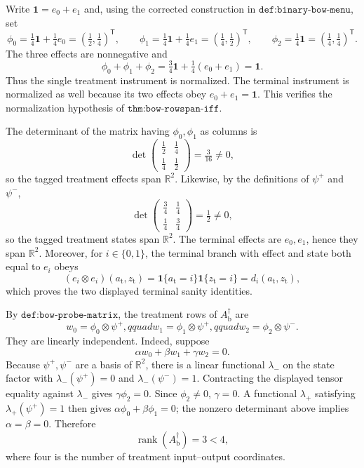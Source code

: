 Write \(\mathbf 1=e_0+e_1\) and, using the corrected construction in \(\texttt{def:binary-bow-menu}\), set
\[
 \phi_0=\tfrac14\mathbf 1+\tfrac14e_0=(\tfrac12,\tfrac14)^{\mathsf T},\qquad
 \phi_1=\tfrac14\mathbf 1+\tfrac14e_1=(\tfrac14,\tfrac12)^{\mathsf T},\qquad
 \phi_2=\tfrac14\mathbf 1=(\tfrac14,\tfrac14)^{\mathsf T}.
\]
The three effects are nonnegative and
\[
 \phi_0+\phi_1+\phi_2
 =\tfrac34\mathbf 1+\tfrac14(e_0+e_1)
 =\mathbf 1.
\]
Thus the single treatment instrument is normalized.  The terminal instrument is normalized as well because its two effects obey \(e_0+e_1=\mathbf 1\).  This verifies the normalization hypothesis of \(\texttt{thm:bow-rowspan-iff}\).

The determinant of the matrix having \(\phi_0,\phi_1\) as columns is
\[
 \det\!\begin{pmatrix}\tfrac12&\tfrac14\\[2pt]\tfrac14&\tfrac12\end{pmatrix}
 =\tfrac{3}{16}\ne0,
\]
so the tagged treatment effects span \(\mathbb R^2\).  Likewise, by the definitions of \(\psi^+\) and \(\psi^-\),
\[
 \det\!\begin{pmatrix}\tfrac34&\tfrac14\\[2pt]\tfrac14&\tfrac34\end{pmatrix}
 =\tfrac12\ne0,
\]
so the tagged treatment states span \(\mathbb R^2\).  The terminal effects are \(e_0,e_1\), hence they span \(\mathbb R^2\).  Moreover, for \(i\in\{0,1\}\), the terminal branch with effect and state both equal to \(e_i\) obeys
\[
 (e_i\otimes e_i)(a_{\mathrm t},z_{\mathrm t})
 =\mathbf 1\{a_{\mathrm t}=i\}\mathbf 1\{z_{\mathrm t}=i\}
 =d_i(a_{\mathrm t},z_{\mathrm t}),
\]
which proves the two displayed terminal sanity identities.

By \(\texttt{def:bow-probe-matrix}\), the treatment rows of \(A_{\mathrm b}^{\dagger}\) are
\[
 w_0=\phi_0\otimes\psi^+,qquad
 w_1=\phi_1\otimes\psi^+,qquad
 w_2=\phi_2\otimes\psi^-.
\]
They are linearly independent.  Indeed, suppose
\[
 \alpha w_0+\beta w_1+\gamma w_2=0.
\]
Because \(\psi^+,\psi^-\) are a basis of \(\mathbb R^2\), there is a linear functional \(\lambda_-\) on the state factor with \(\lambda_-(\psi^+)=0\) and \(\lambda_-(\psi^-)=1\).  Contracting the displayed tensor equality against \(\lambda_-\) gives \(\gamma\phi_2=0\).  Since \(\phi_2\ne0\), \(\gamma=0\).  A functional \(\lambda_+\) satisfying \(\lambda_+(\psi^+)=1\) then gives \(\alpha\phi_0+\beta\phi_1=0\); the nonzero determinant above implies \(\alpha=\beta=0\).  Therefore
\[
 \operatorname{rank}(A_{\mathrm b}^{\dagger})=3<4,
\]
where four is the number of treatment input--output coordinates.

